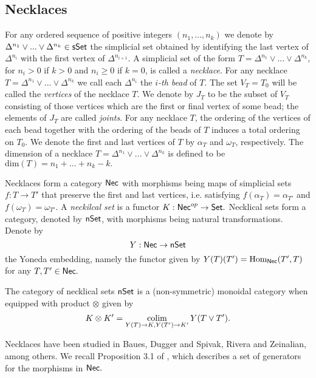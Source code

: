 
\subsection{Necklaces} For any ordered sequence of positive integers $(n_1,...,n_k)$ we denote by $\Delta^{n_1} \vee...\vee \Delta^{n_k} \in \mathsf{sSet}$ the simplicial set obtained by identifying the last vertex of $\Delta^{n_i}$ with the first vertex of $\Delta^{n_{i+1}}.$ A simplicial set of the form $T=\Delta^{n_1} \vee...\vee \Delta^{n_k}$, for $n_i>0$ if $k>0$ and $n_i \geq 0$ if $k=0$, is called a \textit{necklace}. For any necklace $T= \Delta^{n_1} \vee...\vee \Delta^{n_k}$ we call each $\Delta^{n_i}$ the \textit{$i$-th bead} of $T$. The set $V_T=T_0$ will be called the \textit{vertices} of the necklace $T$. We denote by $J_T$ to be the subset of $V_T$ consisting of those vertices which are the first or final vertex of some bead; the elements of $J_T$ are called \textit{joints}. For any necklace $T$, the ordering of the vertices of each bead together with the ordering of the beads of $T$ induces a total ordering on $T_0.$ We denote the first and last vertices of $T$ by $\alpha_T$ and $\omega_T$, respectively. The dimension of a necklace $T=\Delta^{n_1} \vee...\vee \Delta^{n_k}$ is defined to be $\text{dim}(T)=n_1 + ... +n_k-k.$

Necklaces form a category $\mathsf{Nec}$ with morphisms being maps of simplicial sets $f: T \to T'$ that preserve the first and last vertices, i.e. satisfying $f(\alpha_T)=\alpha_{T'}$ and $f(\omega_T)=\omega_{T'}.$ A \textit{neckilcal set} is a functor $K: \mathsf{Nec}^{op} \to \mathsf{Set}.$ Necklical sets form a category, denoted by $\mathsf{nSet}$, with morphisms being natural transformations. Denote by $$Y: \mathsf{Nec} \to \mathsf{nSet}$$ the Yoneda embedding, namely the functor given by $Y(T)(T')= \text{Hom}_{\mathsf{Nec}}(T',T)$ for any $T,T' \in \mathsf{Nec}.$

The category of necklical sets $\mathsf{nSet}$ is a (non-symmetric) monoidal category when equipped with product $\otimes$ given by $$K \otimes K' = \operatorname*{colim}_{Y(T) \to K, Y(T')\to K'} Y(T \vee T').$$

Necklaces have been studied in Baues, Dugger and Spivak, Rivera and Zeinalian,  among others. We recall Proposition 3.1 of \cite{Rivera and Zeinalian, cubical rigidification}, which describes a set of generators for the morphisms in $\mathsf{Nec}.$

